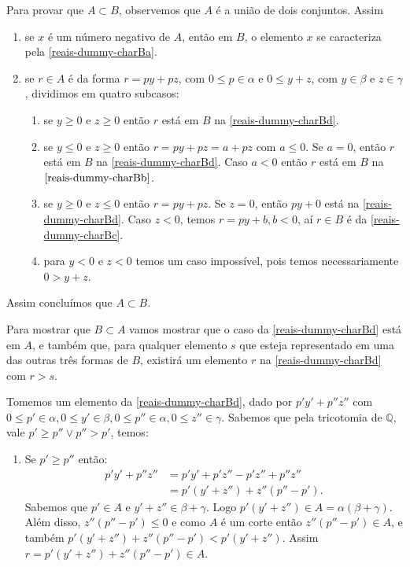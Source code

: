 \documentclass[../main.tex]{subfiles}
\begin{document}
\begin{dem}
    Para provar que $ A \subset B$, observemos que $A$ é a união de dois conjuntos. Assim
    \begin{enumerate}
        \item se $x$ é um número negativo de $A$, então em $B$, o elemento $x$ se caracteriza pela \ref{reais-dummy-charBa}.
        \item {se $r \in A$ é da forma $r = py + pz$, com $0 \leq p \in \alpha$ e $0 \leq y+z$, com $y \in \beta$ e $z \in \gamma$, dividimos em quatro subcasos:
            \begin{enumerate}
                \item se $y \geq 0$ e $z \geq 0$ então $r$ está em $B$ na \ref{reais-dummy-charBd}.
                \item se $y \leq 0$ e $z \geq 0$ então $r = py+pz = a + pz$ com $a \leq 0$. Se $a=0$, então $r$ está em $B$ na \ref{reais-dummy-charBd}. Caso $a < 0$ então $r$ está em $B$ na $\ref{reais-dummy-charBb}$.
                \item se $y \geq 0$ e $z \leq 0$ então $r = py + pz$. Se $z=0$, então $py + 0$ está na \ref{reais-dummy-charBd}. Caso $z<0$, temos $r=py + b, b< 0$, aí $r \in B$ é da \ref{reais-dummy-charBc}.
                \item para $y < 0$ e $z < 0$ temos um caso impossível, pois temos necessariamente $0 > y+z$.
            \end{enumerate}
        }
    \end{enumerate}

    Assim concluímos que $A \subset B$.

    Para mostrar que $B \subset A$ vamos mostrar que o caso da \ref{reais-dummy-charBd} está em $A$, e também que, para qualquer elemento $s$ que esteja representado em uma das outras três formas de $B$, existirá um elemento $r$ na \ref{reais-dummy-charBd} com $r > s$.  
    
    Tomemos um elemento da \ref{reais-dummy-charBd}, dado por $p'y' + p''z''$ com $0 \leq p' \in \alpha, 0 \leq y' \in \beta, 0 \leq p'' \in \alpha, 0 \leq z'' \in \gamma$. 
        Sabemos que pela tricotomia de $\mathbb{Q}$, vale $p' \geq p'' \lor p'' > p'$, temos:\\
        \begin{enumerate}
            \item Se $p' \geq p''$ então:
                \begin{align*}
                    p'y' + p''z'' &= p'y' + p'z'' - p'z'' + p''z'' \\
                    &= p'(y' + z'') + z''(p''-p').
                \end{align*}
                Sabemos que $p' \in A$ e $y'+z'' \in \beta+\gamma$. Logo $p'(y' + z'') \in A = \alpha (\beta+ \gamma)$. Além disso, $z''(p''-p') \leq 0$ e como $A$ é um corte então $z''(p''-p') \in A$, e também $p'(y' + z'')+z''(p''-p') < p'(y' + z'')$. Assim $r = p'(y' + z'') + z''(p''-p') \in A$.
        

\end{enumerate}
\end{dem}
\end{document}
